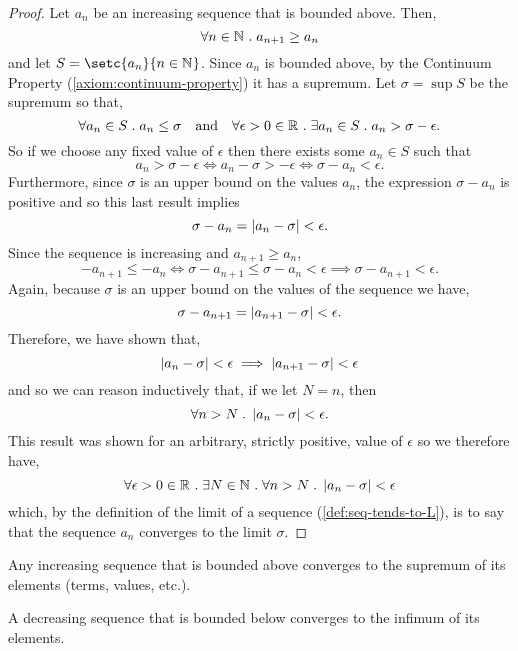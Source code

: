 \documentclass[../MathsNotesBase.tex]{subfiles}
\begin{document}
{		
		\bigskip
		\begin{proof}
			Let $a_n$ be an increasing sequence that is bounded above. Then,
			\[ \forall n \in \mathbb{N}^{} \;.\; a_{n+1} \geq a_n \]
			and let ${ S = \setc{a_n}{n \in \N{}} }$. Since $a_n$ is bounded above, by the Continuum Property (\autoref{axiom:continuum-property}) it has a supremum. Let $ \sigma = \sup S $ be the supremum so that,
			\[ \forall a_n \in S \;.\; a_n \leq \sigma \hspace{10pt}\text{and}\hspace{10pt} \forall \epsilon > 0 \in \mathbb{R}^{} \;.\; \exists a_n \in S \;.\; a_n > \sigma - \epsilon. \]
			So if we choose any fixed value of $\epsilon$ then there exists some ${ a_n \in S }$ such that
			\[ a_n > \sigma - \epsilon \iff a_n - \sigma > -\epsilon \iff \sigma - a_n < \epsilon. \]
			Furthermore, since $\sigma$ is an upper bound on the values $a_n$, the expression ${ \sigma - a_n }$ is positive and so this last result implies
			\[ \sigma - a_n = \left\lvert a_n - \sigma\right\rvert < \epsilon. \]
			Since the sequence is increasing and ${ a_{n+1} \geq a_n }$,
			\[ -a_{n+1} \leq -a_n \iff \sigma - a_{n+1} \leq \sigma - a_n < \epsilon \implies \sigma - a_{n+1} < \epsilon. \]
			Again, because $\sigma$ is an upper bound on the values of the sequence we have,
			\[  \sigma - a_{n+1} = \left\lvert a_{n+1} - \sigma\right\rvert < \epsilon. \]
			Therefore, we have shown that,
			\[ \left\lvert a_n - \sigma\right\rvert < \epsilon \implies \left\lvert a_{n+1} - \sigma\right\rvert < \epsilon \]
			and so we can reason inductively that, if we let ${ N = n }$, then
			\[ \forall n > N \;.\; \left\lvert a_n - \sigma\right\rvert < \epsilon. \]
			This result was shown for an arbitrary, strictly positive, value of $\epsilon$ so we therefore have,
			\[ \forall \epsilon > 0 \in \mathbb{R}^{} \;.\; \exists N \in \mathbb{N}^{} \;.\; \forall n > N \;.\; \left\lvert a_n - \sigma\right\rvert < \epsilon \]
			which, by the definition of the limit of a sequence (\ref{def:seq-tends-to-L}), is to say that the sequence $a_n$ converges to the limit $\sigma$.
		\end{proof}
		
		\medskip
		\begin{corollary}\label{coro:increasing-seq-bounded-above-converges-to-supremum}
			Any increasing sequence that is bounded above converges to the supremum of its elements (terms, values, etc.).
		\end{corollary}
		\begin{corollary}\label{coro:decreasing-seq-bounded-below-converges-to-infimum}
			A decreasing sequence that is bounded below converges to the infimum of its elements.
		\end{corollary}
	
}
\end{document}
